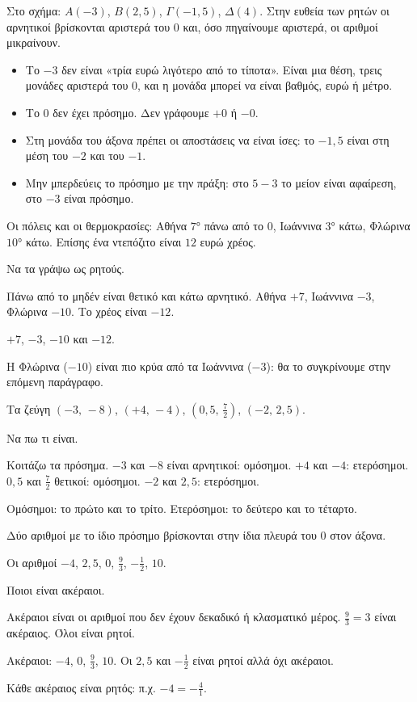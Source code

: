 Στο σχήμα: $A(-3)$, $B(2{,}5)$, $\Gamma(-1{,}5)$, $\Delta(4)$. Στην ευθεία των ρητών οι αρνητικοί βρίσκονται αριστερά του $0$ και, όσο πηγαίνουμε αριστερά, οι αριθμοί μικραίνουν.

\begin{prosoxi}
\begin{itemize}[leftmargin=1.2em,itemsep=0.3ex,topsep=2pt]
\item Το $-3$ δεν είναι «τρία ευρώ λιγότερο από το τίποτα». Είναι μια θέση, τρεις μονάδες αριστερά του $0$, και η μονάδα μπορεί να είναι βαθμός, ευρώ ή μέτρο.
\item Το $0$ δεν έχει πρόσημο. Δεν γράφουμε $+0$ ή $-0$.
\item Στη μονάδα του άξονα πρέπει οι αποστάσεις να είναι ίσες: το $-1{,}5$ είναι στη μέση του $-2$ και του $-1$.
\item Μην μπερδεύεις το πρόσημο με την πράξη: στο $5-3$ το μείον είναι αφαίρεση, στο $-3$ είναι πρόσημο.
\end{itemize}
\end{prosoxi}


\tixero Οι πόλεις και οι θερμοκρασίες: Αθήνα $7$° πάνω από το $0$, Ιωάννινα $3$° κάτω, Φλώρινα $10$° κάτω. Επίσης ένα ντεπόζιτο είναι $12$ ευρώ χρέος.\par
\tithelo Να τα γράψω ως ρητούς.\par
\possindeo Πάνω από το μηδέν είναι θετικό και κάτω αρνητικό. Αθήνα $+7$, Ιωάννινα $-3$, Φλώρινα $-10$. Το χρέος είναι $-12$.\par
\apantisi $+7$, $-3$, $-10$ και $-12$.\par
\elegxos Η Φλώρινα ($-10$) είναι πιο κρύα από τα Ιωάννινα ($-3$): θα το συγκρίνουμε στην επόμενη παράγραφο.

\tixero Τα ζεύγη $(-3,\,-8)$, $(+4,\,-4)$, $(0{,}5,\,\frac{7}{2})$, $(-2,\,2{,}5)$.\par
\tithelo Να πω τι είναι.\par
\possindeo Κοιτάζω τα πρόσημα. $-3$ και $-8$ είναι αρνητικοί: ομόσημοι. $+4$ και $-4$: ετερόσημοι. $0{,}5$ και $\frac{7}{2}$ θετικοί: ομόσημοι. $-2$ και $2{,}5$: ετερόσημοι.\par
\apantisi Ομόσημοι: το πρώτο και το τρίτο. Ετερόσημοι: το δεύτερο και το τέταρτο.\par
\elegxos Δύο αριθμοί με το ίδιο πρόσημο βρίσκονται στην ίδια πλευρά του $0$ στον άξονα.

\tixero Οι αριθμοί $-4$, $2{,}5$, $0$, $\frac{9}{3}$, $-\frac{1}{2}$, $10$.\par
\tithelo Ποιοι είναι ακέραιοι.\par
\possindeo Ακέραιοι είναι οι αριθμοί που δεν έχουν δεκαδικό ή κλασματικό μέρος. $\frac{9}{3}=3$ είναι ακέραιος. Όλοι είναι ρητοί.\par
\apantisi Ακέραιοι: $-4$, $0$, $\frac{9}{3}$, $10$. Οι $2{,}5$ και $-\frac{1}{2}$ είναι ρητοί αλλά όχι ακέραιοι.\par
\elegxos Κάθε ακέραιος είναι ρητός: π.χ. $-4=-\frac{4}{1}$.

